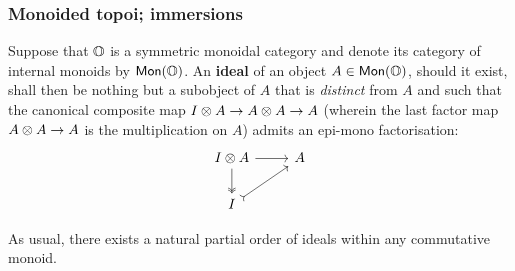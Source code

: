             \subsubsection{Monoided topoi; immersions}
                \begin{definition}[Ideals] \label{def: ideals_in_symmetric_monoidal_categories}
                    Suppose that $\mathbb{O}$ is a symmetric monoidal category and denote its category of internal monoids by $\mathsf{Mon}(\mathbb{O})$. An \textbf{ideal} of an object $A \in \mathsf{Mon}(\mathbb{O})$, should it exist, shall then be nothing but a subobject of $A$ that is \textit{distinct} from $A$ and such that the canonical composite map $I \tensor A \to A \tensor A \to A$ (wherein the last factor map $A \tensor A \to A$ is the multiplication on $A$) admits an epi-mono factorisation:
                        $$
                            \begin{tikzcd}
                            	{I \tensor A} & A \\
                            	I
                            	\arrow[two heads, from=1-1, to=2-1]
                            	\arrow[tail, from=2-1, to=1-2]
                            	\arrow[from=1-1, to=1-2]
                            \end{tikzcd}
                        $$    
                \end{definition}
                \begin{remark}
                    As usual, there exists a natural partial order of ideals within any commutative monoid.
                \end{remark}
                
